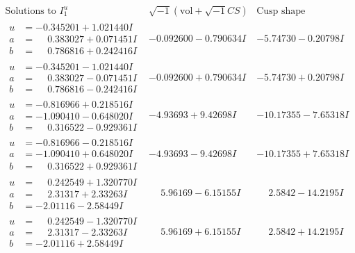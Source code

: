 \documentclass[1p]{elsarticle_modified}
\theoremstyle{definition}
\newcommand{\I}{\sqrt{-1}}
\begin{document}
$$\begin{array}{c|c|c}  
\text{Solutions to }I^u_{1}& \I (\text{vol} + \sqrt{-1}CS) & \text{Cusp shape}\\
 \hline 
\begin{aligned}
u &= -0.345201 + 1.021440 I \\
a &= \phantom{-}0.383027 + 0.071451 I \\
b &= \phantom{-}0.786816 + 0.242416 I\end{aligned}
 & -0.092600 - 0.790634 I & -5.74730 - 0.20798 I \\ \hline\begin{aligned}
u &= -0.345201 - 1.021440 I \\
a &= \phantom{-}0.383027 - 0.071451 I \\
b &= \phantom{-}0.786816 - 0.242416 I\end{aligned}
 & -0.092600 + 0.790634 I & -5.74730 + 0.20798 I \\ \hline\begin{aligned}
u &= -0.816966 + 0.218516 I \\
a &= -1.090410 - 0.648020 I \\
b &= \phantom{-}0.316522 - 0.929361 I\end{aligned}
 & -4.93693 + 9.42698 I & -10.17355 - 7.65318 I \\ \hline\begin{aligned}
u &= -0.816966 - 0.218516 I \\
a &= -1.090410 + 0.648020 I \\
b &= \phantom{-}0.316522 + 0.929361 I\end{aligned}
 & -4.93693 - 9.42698 I & -10.17355 + 7.65318 I \\ \hline\begin{aligned}
u &= \phantom{-}0.242549 + 1.320770 I \\
a &= \phantom{-}2.31317 + 2.33263 I \\
b &= -2.01116 - 2.58449 I\end{aligned}
 & \phantom{-}5.96169 - 6.15155 I & \phantom{-}2.5842 - 14.2195 I \\ \hline\begin{aligned}
u &= \phantom{-}0.242549 - 1.320770 I \\
a &= \phantom{-}2.31317 - 2.33263 I \\
b &= -2.01116 + 2.58449 I\end{aligned}
 & \phantom{-}5.96169 + 6.15155 I & \phantom{-}2.5842 + 14.2195 I \\ \hline\begin{aligned}

\end{aligned}
\end{array}$$
\end{document}
